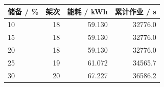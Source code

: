 \begin{tabular}{lrrr}
\toprule
储备 / \% & 架次 & 能耗 / kWh & 累计作业 / s \\
\midrule
10 & 18 & 59.130 & 32776.0 \\
15 & 18 & 59.130 & 32776.0 \\
20 & 18 & 59.130 & 32776.0 \\
25 & 19 & 61.072 & 34565.7 \\
30 & 20 & 67.227 & 36586.2 \\
\bottomrule
\end{tabular}
